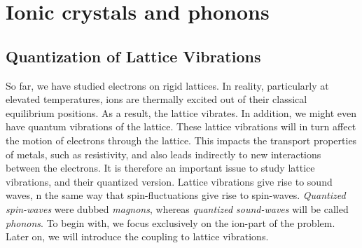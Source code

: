 \chapter{Ionic crystals and phonons}
\section{Quantization of Lattice Vibrations}

So far, we have studied electrons on rigid lattices. In reality, particularly at elevated temperatures, ions are thermally excited out of their classical equilibrium positions. As a result, the lattice vibrates.
In addition, we might even have quantum vibrations of the lattice. 
These lattice vibrations will in turn affect the motion of electrons through the lattice. 
This impacts the transport properties of metals, such as resistivity, and also leads indirectly to new interactions between the electrons. 
It is therefore an important issue to study lattice vibrations, and their quantized version.
Lattice vibrations give rise to sound waves, n the same way that spin-fluctuations give rise to spin-waves.
\emph{Quantized spin-waves} were dubbed \emph{magnons}, whereas \emph{quantized sound-waves} will be called \emph{phonons}.
To begin with, we focus exclusively on the ion-part of the problem. Later on, we will introduce the coupling to lattice vibrations. 

